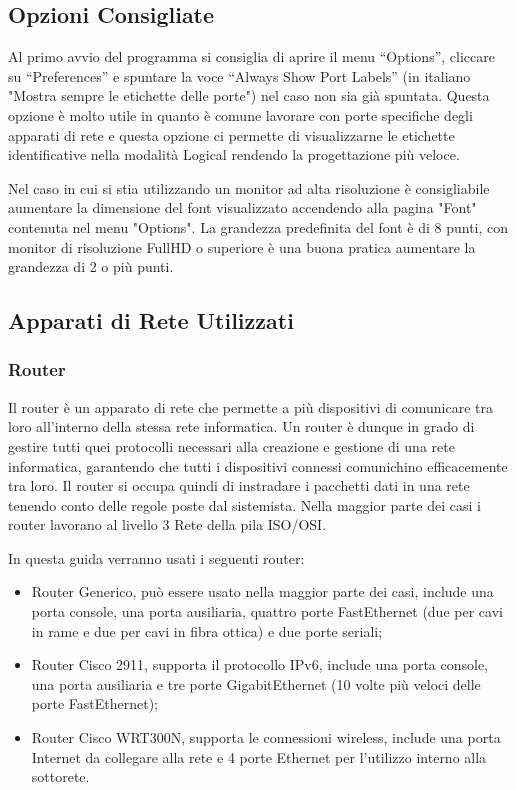 \subsection{Opzioni Consigliate}
Al primo avvio del programma si consiglia di aprire il menu “Options”, cliccare su “Preferences” e spuntare la voce “Always Show Port Labels” (in italiano "Mostra sempre le etichette delle porte") nel caso non sia già spuntata. Questa opzione è molto utile in quanto è comune lavorare con porte specifiche degli apparati di rete e questa opzione ci permette di visualizzarne le etichette identificative nella modalità Logical rendendo la progettazione più veloce.

\smallskip

\noindent Nel caso in cui si stia utilizzando un monitor ad alta risoluzione è consigliabile aumentare la dimensione del font visualizzato accendendo alla pagina "Font" contenuta nel menu "Options". La grandezza predefinita del font è di 8 punti, con monitor di risoluzione FullHD o superiore è una buona pratica aumentare la grandezza di 2 o più punti.

\subsection{Apparati di Rete Utilizzati}

\subsubsection{Router}
Il router è un apparato di rete che permette a più dispositivi di comunicare tra loro all'interno della stessa rete informatica. Un router è dunque in grado di gestire tutti quei protocolli necessari alla creazione e gestione di una rete informatica, garantendo che tutti i dispositivi connessi comunichino efficacemente tra loro. Il router si occupa quindi di instradare i pacchetti dati in una rete tenendo conto delle regole poste dal sistemista. Nella maggior parte dei casi i router lavorano al livello 3 Rete della pila ISO/OSI.

\smallskip

\noindent In questa guida verranno usati i seguenti router:

\begin{itemize}
    \item Router Generico, può essere usato nella maggior parte dei casi, include una porta console, una porta ausiliaria, quattro porte FastEthernet (due per cavi in rame e due per cavi in fibra ottica) e due porte seriali;
    \item Router Cisco 2911, supporta il protocollo IPv6, include una porta console, una porta ausiliaria e tre porte GigabitEthernet (10 volte più veloci delle porte FastEthernet);
    \item Router Cisco WRT300N, supporta le connessioni wireless, include una porta Internet da collegare alla rete e 4 porte Ethernet per l'utilizzo interno alla sottorete.
\end{itemize}

